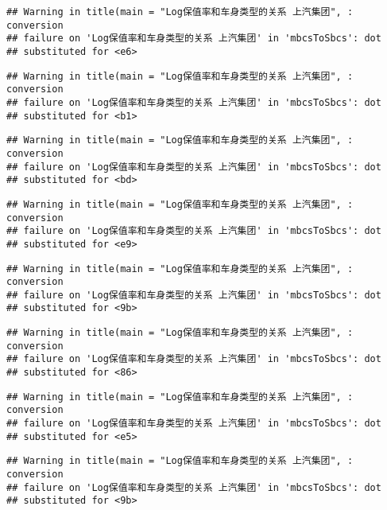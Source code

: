 \documentclass[]{article}
\begin{document}
\begin{verbatim}
## Warning in title(main = "Log保值率和车身类型的关系 上汽集团", : conversion
## failure on 'Log保值率和车身类型的关系 上汽集团' in 'mbcsToSbcs': dot
## substituted for <e6>
\end{verbatim}

\begin{verbatim}
## Warning in title(main = "Log保值率和车身类型的关系 上汽集团", : conversion
## failure on 'Log保值率和车身类型的关系 上汽集团' in 'mbcsToSbcs': dot
## substituted for <b1>
\end{verbatim}

\begin{verbatim}
## Warning in title(main = "Log保值率和车身类型的关系 上汽集团", : conversion
## failure on 'Log保值率和车身类型的关系 上汽集团' in 'mbcsToSbcs': dot
## substituted for <bd>
\end{verbatim}

\begin{verbatim}
## Warning in title(main = "Log保值率和车身类型的关系 上汽集团", : conversion
## failure on 'Log保值率和车身类型的关系 上汽集团' in 'mbcsToSbcs': dot
## substituted for <e9>
\end{verbatim}

\begin{verbatim}
## Warning in title(main = "Log保值率和车身类型的关系 上汽集团", : conversion
## failure on 'Log保值率和车身类型的关系 上汽集团' in 'mbcsToSbcs': dot
## substituted for <9b>
\end{verbatim}

\begin{verbatim}
## Warning in title(main = "Log保值率和车身类型的关系 上汽集团", : conversion
## failure on 'Log保值率和车身类型的关系 上汽集团' in 'mbcsToSbcs': dot
## substituted for <86>
\end{verbatim}

\begin{verbatim}
## Warning in title(main = "Log保值率和车身类型的关系 上汽集团", : conversion
## failure on 'Log保值率和车身类型的关系 上汽集团' in 'mbcsToSbcs': dot
## substituted for <e5>
\end{verbatim}

\begin{verbatim}
## Warning in title(main = "Log保值率和车身类型的关系 上汽集团", : conversion
## failure on 'Log保值率和车身类型的关系 上汽集团' in 'mbcsToSbcs': dot
## substituted for <9b>
\end{verbatim}
\end{document}
